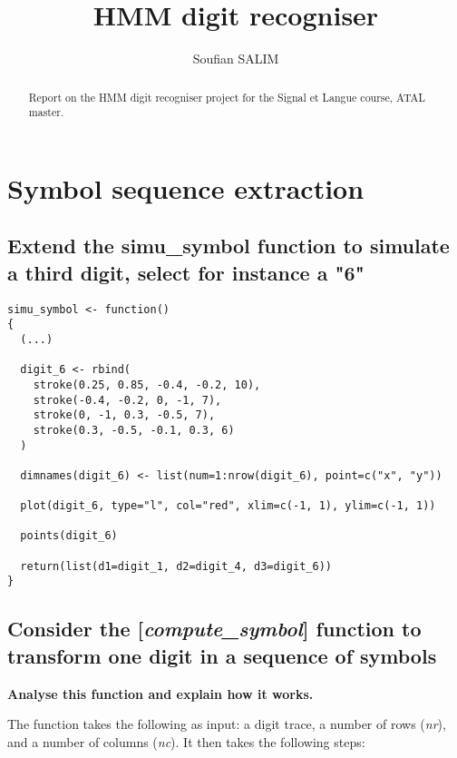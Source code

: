 \documentclass[a4paper]{article}
\title{HMM digit recogniser}
\author{Soufian SALIM}
\begin{document}
\maketitle

\begin{abstract}

Report on the HMM digit recogniser project for the Signal et Langue course, ATAL master.

\end{abstract}

\newpage

\tableofcontents

\newpage

\section{Symbol sequence extraction}

\subsection{Extend the simu\_symbol function to simulate a third digit, select for instance a "6"}

\begin{lstlisting}
simu_symbol <- function() 
{
  (...)
  
  digit_6 <- rbind(
    stroke(0.25, 0.85, -0.4, -0.2, 10),
    stroke(-0.4, -0.2, 0, -1, 7),
    stroke(0, -1, 0.3, -0.5, 7),
    stroke(0.3, -0.5, -0.1, 0.3, 6)
  )
  
  dimnames(digit_6) <- list(num=1:nrow(digit_6), point=c("x", "y"))
  
  plot(digit_6, type="l", col="red", xlim=c(-1, 1), ylim=c(-1, 1))
  
  points(digit_6)
  
  return(list(d1=digit_1, d2=digit_4, d3=digit_6))
}
\end{lstlisting}

\subsection{Consider the [{\it compute\_symbol}] function to transform one digit in a sequence of symbols}

\textbf{Analyse this function and explain how it works.} \newline

The function takes the following as input: a digit trace, a number of rows ({\it nr}), and a number of columns ({\it nc}). It then takes the following steps: \newline
\end{document}
